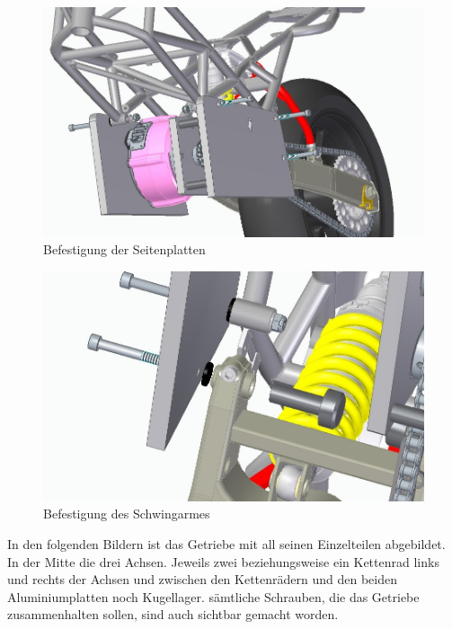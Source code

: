 \begin{figure} [H]
	\begin{center}
		\includegraphics[scale=0.5]{figures/mechanik/Zusamenbau_1.jpg}
			\caption{Befestigung der Seitenplatten}
			\label{fig:Befestigung der Seitenplatten}
	\end{center}
\end{figure}


\begin{figure} [H]
	\begin{center}
		\includegraphics[scale=0.5]{figures/mechanik/Zusammenbau_Schwingarm.jpg}
			\caption{Befestigung des Schwingarmes}
			\label{fig:Befestigung des Schwingarmes}
	\end{center}
\end{figure}

\newpage

In den folgenden Bildern ist das Getriebe mit all seinen Einzelteilen abgebildet. 
In der Mitte die drei Achsen. Jeweils zwei beziehungsweise ein Kettenrad links und rechts der Achsen und zwischen den Kettenrädern und den beiden Aluminiumplatten noch Kugellager.
sämtliche Schrauben, die das Getriebe zusammenhalten sollen, sind auch sichtbar gemacht worden.


